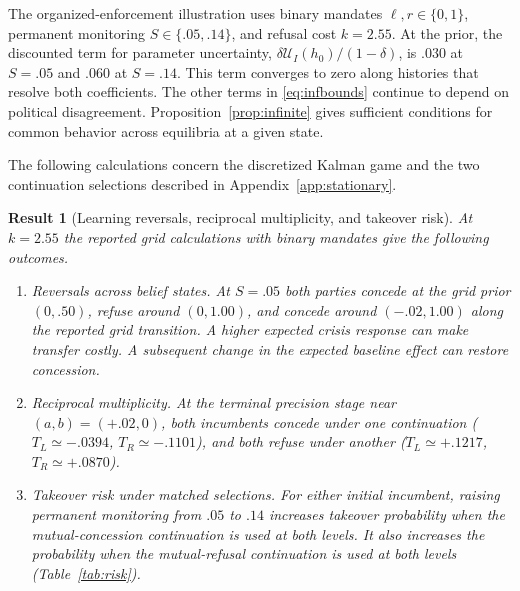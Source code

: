 \documentclass[11pt,letterpaper]{article}
\newtheorem{result}{Result}
\begin{document}
The organized-enforcement illustration uses binary mandates $\ell,r\in\{0,1\}$, permanent monitoring $S\in\{.05,.14\}$, and refusal cost $k=2.55$. At the prior, the discounted term for parameter uncertainty, $\delta\mathcal U_I(h_0)/(1-\delta)$, is $.030$ at $S=.05$ and $.060$ at $S=.14$. This term converges to zero along histories that resolve both coefficients. The other terms in \eqref{eq:infbounds} continue to depend on political disagreement. Proposition~\ref{prop:infinite} gives sufficient conditions for common behavior across equilibria at a given state.

The following calculations concern the discretized Kalman game and the two continuation selections described in Appendix~\ref{app:stationary}.

\begin{result}[Learning reversals, reciprocal multiplicity, and takeover risk]\label{prop:stationary}
At $k=2.55$ the reported grid calculations with binary mandates give the following outcomes.
\begin{enumerate}
\item \emph{Reversals across belief states.} At $S=.05$ both parties concede at the grid prior $(0,.50)$, refuse around $(0,1.00)$, and concede around $(-.02,1.00)$ along the reported grid transition. A higher expected crisis response can make transfer costly. A subsequent change in the expected baseline effect can restore concession.
\item \emph{Reciprocal multiplicity.} At the terminal precision stage near $(a,b)=(+.02,0)$, both incumbents concede under one continuation ($T_L\simeq-.0394$, $T_R\simeq-.1101$), and both refuse under another ($T_L\simeq+.1217$, $T_R\simeq+.0870$).
\item \emph{Takeover risk under matched selections.} For either initial incumbent, raising permanent monitoring from $.05$ to $.14$ increases takeover probability when the mutual-concession continuation is used at both levels. It also increases the probability when the mutual-refusal continuation is used at both levels (Table~\ref{tab:risk}).
\end{enumerate}
\end{result}
\end{document}
